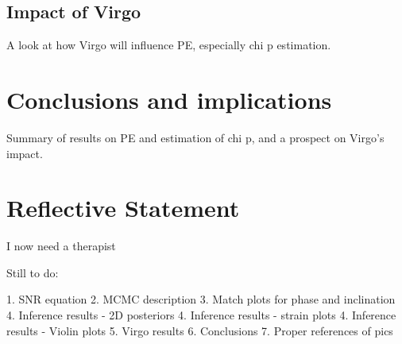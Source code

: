 \documentclass[11pt]{article}
\begin{document}
\subsection{Impact of Virgo}
A look at how Virgo will influence PE, especially chi p estimation.
\section{Conclusions and implications}
Summary of results on PE and estimation of chi p, and a prospect on Virgo's impact.
\section{Reflective Statement}
I now need a therapist

Still to do:

1. SNR equation
2. MCMC description
3. Match plots for phase and inclination
4. Inference results - 2D posteriors
4. Inference results - strain plots
4. Inference results - Violin plots
5. Virgo results
6. Conclusions
7. Proper references of pics

%
\end{document}
